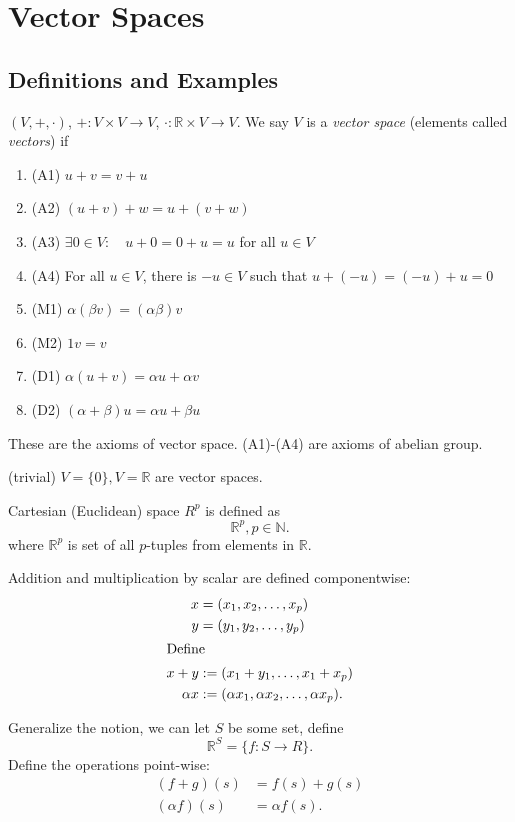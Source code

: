 
\section{Vector Spaces}
\subsection{Definitions and Examples}

\begin{definition}
	$(V, +, \cdot)$, $+: V\times V \to  V$, $\cdot: \mathbb{R} \times  V \to  V$. We say $V$ is a \textit{vector space} (elements called \textit{vectors}) if
	\begin{enumerate}
		\item (A1) $u + v = v + u$
		\item (A2) $(u + v) + w = u + (v + w)$ 
		\item (A3) $\exists  0 \in V: \quad u+0 = 0+u = u$ for all $u \in V$
		\item (A4) For all $u \in V$, there is $-u \in V$ such that $u + (-u) = (-u) + u = 0$ 
		\item (M1) $\alpha(\beta v) = (\alpha\beta) v$ 
		\item (M2) $1 v = v$
		\item (D1)  $\alpha(u+v) = \alpha u + \alpha v$
		\item (D2) $(\alpha+\beta)u = \alpha u + \beta u$
	\end{enumerate}
	These are the axioms of vector space. (A1)-(A4) are axioms of abelian group.
\end{definition}

\begin{example}
	(trivial) $V = \{0\} , V = \mathbb{R}$ are vector spaces.
\end{example}

\begin{definition}
	Cartesian (Euclidean) space $R^p$ is defined as
	 \[
		\mathbb{R}^p, p \in \mathbb{N}
	.\] 
	where $\mathbb{R}^p$ is set of all $p$-tuples from elements in $\mathbb{R}$.

	Addition and multiplication by scalar are defined componentwise: 
	\begin{align*}
		x &= (x_1, x_2, \ldots, x_p) \\
		y &= (y_1, y_2, \ldots, y_p) \\
		\intertext{Define}
		x+y &:= (x_1+y_1, \ldots,x_1+x_p)\\
		\alpha x &:= (\alpha x_1, \alpha x_2, \ldots, \alpha x_p)
	.\end{align*}
\end{definition}
\begin{remark}
	
Generalize the notion, we can let $S $ be some set, define \[
	\mathbb{R}^S = \{f: S \to  R\} 
.\] 
Define the operations point-wise:
\begin{align*}
	(f+g)(s) &=  f(s) + g(s) \\
	(\alpha f)(s) &= \alpha f(s) 
.\end{align*}
\end{remark}

